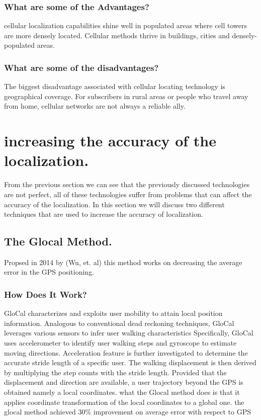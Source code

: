 \subsubsection{What are some of the Advantages?}
cellular localization  capabilities shine well in populated areas where cell towers are more densely located. Cellular methods thrive in buildings, cities and densely-populated areas.\cite{agmonitoring}
\subsubsection{What are some of the disadvantages?}
The biggest disadvantage associated with cellular locating technology is geographical coverage. For subscribers in rural areas or people who travel away from home, cellular networks are not always a reliable ally.\cite{agmonitoring}
\section{increasing the accuracy of the localization.}
From the previous section we can see that the previously discussed technologies are not perfect, all of these technologies suffer from problems that can affect the accuracy of the localization. In this section we will discuss two different techniques that are used to increase the accuracy of localization.
\subsection{The Glocal Method.}
Propsed in 2014 by (Wu, et. al)\cite{wu} this method works on decreasing the average error in the GPS positioning.
\subsubsection{How Does It Work?}
GloCal characterizes and exploits user mobility to attain local position information. Analogous to conventional dead reckoning techniques, GloCal leverages various sensors to infer user walking characteristics Specifically,
GloCal uses accelerometer to identify user walking steps and gyroscope to estimate moving directions. Acceleration feature is further investigated to determine the accurate stride length of a specific user. The walking displacement is then derived by multiplying the step counts with the stride length. Provided that the displacement and direction are available, a user trajectory beyond the GPS is obtained namely a local coordinates. what the Glocal method does is that it applies coordinate transformation of the local coordinates to a global one. 
the glocal method achieved  30\%  improvement on average error with respect to GPS 
